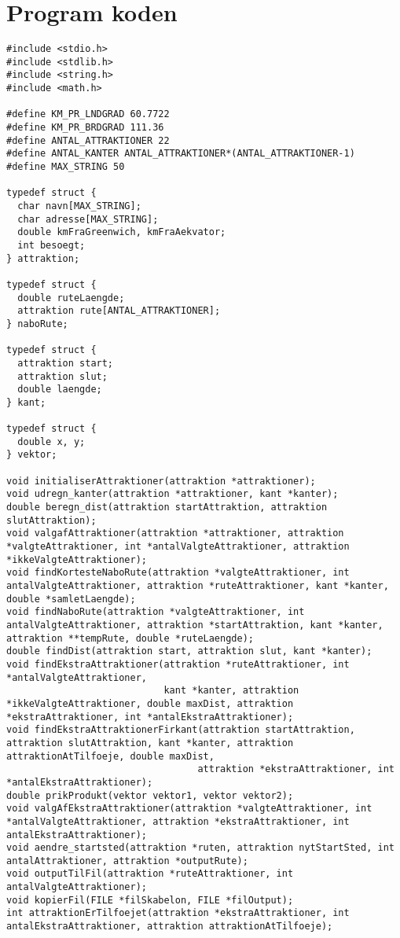 \chapter{Program koden}
\begin{lstlisting}
#include <stdio.h>
#include <stdlib.h>
#include <string.h>
#include <math.h>

#define KM_PR_LNDGRAD 60.7722
#define KM_PR_BRDGRAD 111.36
#define ANTAL_ATTRAKTIONER 22
#define ANTAL_KANTER ANTAL_ATTRAKTIONER*(ANTAL_ATTRAKTIONER-1)
#define MAX_STRING 50

typedef struct {
  char navn[MAX_STRING];
  char adresse[MAX_STRING]; 
  double kmFraGreenwich, kmFraAekvator;
  int besoegt;
} attraktion;

typedef struct {
  double ruteLaengde;
  attraktion rute[ANTAL_ATTRAKTIONER];
} naboRute;

typedef struct {
  attraktion start;
  attraktion slut;
  double laengde;
} kant;

typedef struct {
  double x, y;
} vektor;

void initialiserAttraktioner(attraktion *attraktioner);
void udregn_kanter(attraktion *attraktioner, kant *kanter);
double beregn_dist(attraktion startAttraktion, attraktion slutAttraktion);
void valgafAttraktioner(attraktion *attraktioner, attraktion *valgteAttraktioner, int *antalValgteAttraktioner, attraktion *ikkeValgteAttraktioner);
void findKortesteNaboRute(attraktion *valgteAttraktioner, int antalValgteAttraktioner, attraktion *ruteAttraktioner, kant *kanter, double *samletLaengde);
void findNaboRute(attraktion *valgteAttraktioner, int antalValgteAttraktioner, attraktion *startAttraktion, kant *kanter, attraktion **tempRute, double *ruteLaengde);
double findDist(attraktion start, attraktion slut, kant *kanter);
void findEkstraAttraktioner(attraktion *ruteAttraktioner, int *antalValgteAttraktioner, 
                            kant *kanter, attraktion *ikkeValgteAttraktioner, double maxDist, attraktion *ekstraAttraktioner, int *antalEkstraAttraktioner);
void findEkstraAttraktionerFirkant(attraktion startAttraktion, attraktion slutAttraktion, kant *kanter, attraktion attraktionAtTilfoeje, double maxDist,
                                  attraktion *ekstraAttraktioner, int *antalEkstraAttraktioner);
double prikProdukt(vektor vektor1, vektor vektor2);
void valgAfEkstraAttraktioner(attraktion *valgteAttraktioner, int *antalValgteAttraktioner, attraktion *ekstraAttraktioner, int antalEkstraAttraktioner);
void aendre_startsted(attraktion *ruten, attraktion nytStartSted, int antalAttraktioner, attraktion *outputRute);
void outputTilFil(attraktion *ruteAttraktioner, int antalValgteAttraktioner);
void kopierFil(FILE *filSkabelon, FILE *filOutput);
int attraktionErTilfoejet(attraktion *ekstraAttraktioner, int antalEkstraAttraktioner, attraktion attraktionAtTilfoeje);


\end{lstlisting}
